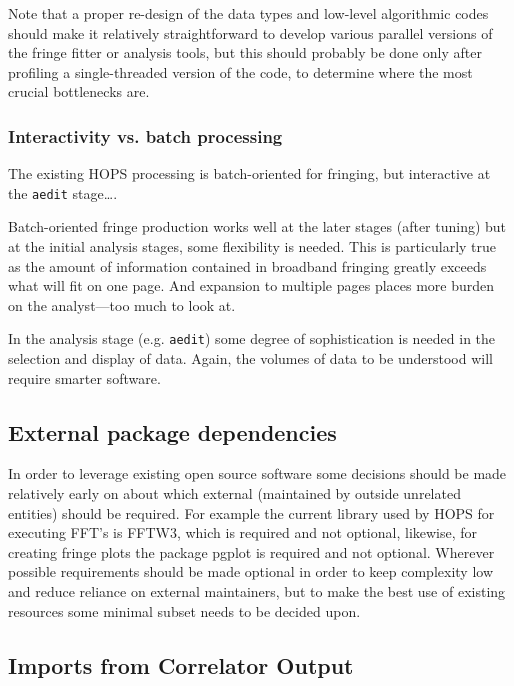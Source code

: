 Note that a proper re-design of the data types and low-level algorithmic
codes should make it relatively straightforward to develop various
parallel versions of the fringe fitter or analysis tools, but this should probably be done
only after profiling a single-threaded version of the code, to determine where the most crucial
bottlenecks are.

\subsubsection{Interactivity vs. batch processing}
\label{sec:software-interaction}

The existing HOPS processing is batch-oriented for fringing, but
interactive at the \texttt{aedit} stage\dots.

Batch-oriented fringe production works well at the later stages (after
tuning) but at the initial analysis stages, some flexibility is needed.
This is particularly true as the amount of information contained in
broadband fringing greatly exceeds what will fit on one page.  And
expansion to multiple pages places more burden on the analyst---too
much to look at.

In the analysis stage (e.g. \texttt{aedit}) some degree of sophistication is
needed in the selection and display of data.  Again, the volumes of
data to be understood will require smarter software.

\subsection{External package dependencies}
\label{sec:software-externals}

In order to leverage existing open source software some decisions should be made relatively early on about which external (maintained by outside unrelated entities)
should be required. For example the current library used by HOPS for executing FFT's is FFTW3, which is required and not optional, likewise, for creating fringe
plots the package pgplot is required and not optional. Wherever possible requirements should be made optional in order to keep complexity low and reduce reliance on
external maintainers, but to make the best use of existing resources some minimal subset needs to be decided upon.

\subsection{Imports from Correlator Output}
\label{sec:corr-imports}

